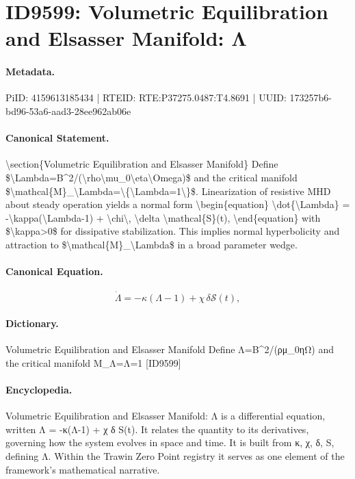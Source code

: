 \section*{ID9599: Volumetric Equilibration and Elsasser Manifold: Λ}
\paragraph{Metadata.}
PiID: 4159613185434 | RTEID: RTE:P37275.0487:T4.8691 | UUID: 173257b6-bd96-53a6-aad3-28ee962ab06e

\paragraph{Canonical Statement.}
\textbackslash{}section\{Volumetric Equilibration and Elsasser Manifold\} Define \$\textbackslash{}Lambda=B\textasciicircum{}2/(\textbackslash{}rho\textbackslash{}mu\_0\textbackslash{}eta\textbackslash{}Omega)\$ and the critical manifold \$\textbackslash{}mathcal\{M\}\_\textbackslash{}Lambda=\textbackslash{}\{\textbackslash{}Lambda=1\textbackslash{}\}\$. Linearization of resistive MHD about steady operation yields a normal form \textbackslash{}begin\{equation\} \textbackslash{}dot\{\textbackslash{}Lambda\} = -\textbackslash{}kappa(\textbackslash{}Lambda-1) + \textbackslash{}chi\textbackslash{}, \textbackslash{}delta \textbackslash{}mathcal\{S\}(t), \textbackslash{}end\{equation\} with \$\textbackslash{}kappa>0\$ for dissipative stabilization. This implies normal hyperbolicity and attraction to \$\textbackslash{}mathcal\{M\}\_\textbackslash{}Lambda\$ in a broad parameter wedge.

\paragraph{Canonical Equation.}
\[
\dot{\Lambda} = -\kappa(\Lambda-1) + \chi\, \delta \mathcal{S}(t),
\]

\paragraph{Dictionary.}
Volumetric Equilibration and Elsasser Manifold Define Λ=B\textasciicircum{}2/(ρμ\_0ηΩ) and the critical manifold M\_Λ=Λ=1 [ID9599]

\paragraph{Encyclopedia.}
Volumetric Equilibration and Elsasser Manifold: Λ is a differential equation, written Λ = -κ(Λ-1) + χ δ S(t). It relates the quantity to its derivatives, governing how the system evolves in space and time. It is built from κ, χ, δ, S, defining Λ. Within the Trawin Zero Point registry it serves as one element of the framework's mathematical narrative.
